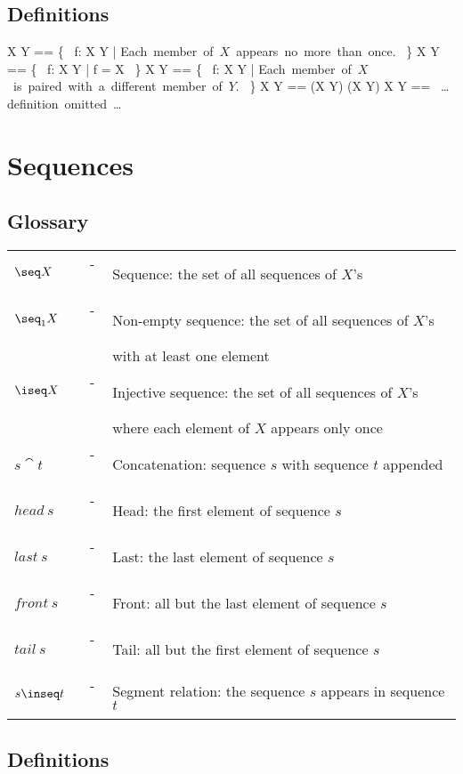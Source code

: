 \subsection*{Definitions}

\begin{zed}
 X \pfun Y == \{~ f: X \rel Y | \mbox{Each member of $X$ appears no more than once.} ~\}
\also
 X \fun Y == \{~ f: X \pfun Y | \dom f = X ~\}
\also
 X \pinj Y == \{~ f: X \pfun Y | \mbox{Each member of $X$ is paired with a different member of $Y$.} ~\}
\also
 X \inj Y == (X \pinj Y) \cap (X \fun Y)
\also
 X \bij Y == \mbox{ \dots definition omitted \dots }
\end{zed}

\newpage

\section*{Sequences}

\subsection*{Glossary}

\begin{tabular}{l c l}
$\seq X$ & ~-~ & Sequence: the set of all sequences of $X$'s \\
$\seq_1 X$ & ~-~ & Non-empty sequence: the set of all sequences of $X$'s \\
	&  & with at least one element \\
$\iseq X$ & ~-~ & Injective sequence: the set of all sequences of $X$'s \\
	&  & where each element of $X$ appears only once \\
$s \cat t$ & ~-~ & Concatenation: sequence $s$ with sequence $t$ appended \\
$head~s$ & ~-~ & Head: the first element of sequence $s$ \\
$last~s$ & ~-~ & Last: the last element of sequence $s$ \\
$front~s$ & ~-~ & Front: all but the last element of sequence $s$ \\
$tail~s$ & ~-~ & Tail: all but the first element of sequence $s$ \\
$s \inseq t$ & ~-~ & Segment relation: the sequence $s$ appears in sequence $t$
\end{tabular}

\subsection*{Definitions}

